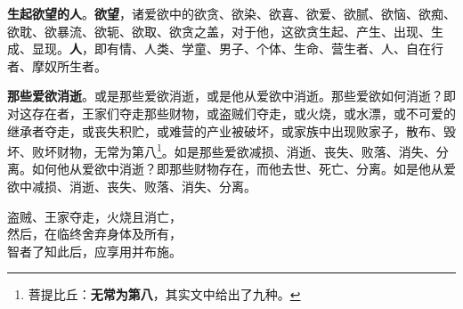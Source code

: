 \textbf{生起欲望的人}。\textbf{欲望}，诸爱欲中的欲贪、欲染、欲喜、欲爱、欲腻、欲恼、欲痴、欲耽、欲暴流、欲轭、欲取、欲贪之盖，对于他，这欲贪生起、产生、出现、生成、显现。\textbf{人}，即有情、人类、学童、男子、个体、生命、营生者、人、自在行者、摩奴所生者。


\textbf{那些爱欲消逝}。或是那些爱欲消逝，或是他从爱欲中消逝。那些爱欲如何消逝？即对这存在者，王家们夺走那些财物，或盗贼们夺走，或火烧，或水漂，或不可爱的继承者夺走，或丧失积贮，或难营的产业被破坏，或家族中出现败家子，散布、毁坏、败坏财物，无常为第八\footnote{菩提比丘：\textbf{无常为第八}，其实文中给出了九种。}。如是那些爱欲减损、消逝、丧失、败落、消失、分离。如何他从爱欲中消逝？即那些财物存在，而他去世、死亡、分离。如是他从爱欲中减损、消逝、丧失、败落、消失、分离。


\begin{quoting}盗贼、王家夺走，火烧且消亡，\\然后，在临终舍弃身体及所有，\\智者了知此后，应享用并布施。\end{quoting}


